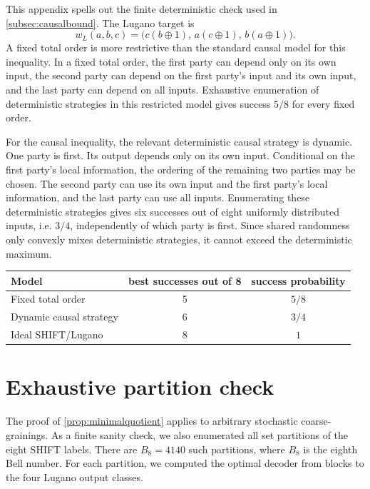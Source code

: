 \documentclass[11pt,a4paper]{article}
\begin{document}
This appendix spells out the finite deterministic check used in \cref{subsec:causalbound}.  The Lugano target is
\begin{equation}
    w_L(a,b,c)=\big(c(b\oplus1),\,a(c\oplus1),\,b(a\oplus1)\big).
\end{equation}
A fixed total order is more restrictive than the standard causal model for this inequality.  In a fixed total order, the first party can depend only on its own input, the second party can depend on the first party's input and its own input, and the last party can depend on all inputs.  Exhaustive enumeration of deterministic strategies in this restricted model gives success $5/8$ for every fixed order.

For the causal inequality, the relevant deterministic causal strategy is dynamic.  One party is first.  Its output depends only on its own input.  Conditional on the first party's local information, the ordering of the remaining two parties may be chosen.  The second party can use its own input and the first party's local information, and the last party can use all inputs.  Enumerating these deterministic strategies gives six successes out of eight uniformly distributed inputs, i.e. $3/4$, independently of which party is first.  Since shared randomness only convexly mixes deterministic strategies, it cannot exceed the deterministic maximum.

\begin{center}
\begin{tabular}{lcc}
\toprule
Model & best successes out of 8 & success probability\\
\midrule
Fixed total order & 5 & $5/8$\\
Dynamic causal strategy & 6 & $3/4$\\
Ideal SHIFT/Lugano & 8 & $1$\\
\bottomrule
\end{tabular}
\end{center}

\section{Exhaustive partition check}
\label{app:partition-check}

The proof of \cref{prop:minimalquotient} applies to arbitrary stochastic coarse-grainings.  As a finite sanity check, we also enumerated all set partitions of the eight SHIFT labels.  There are $B_8=4140$ such partitions, where $B_8$ is the eighth Bell number.  For each partition, we computed the optimal decoder from blocks to the four Lugano output classes.
\end{document}

